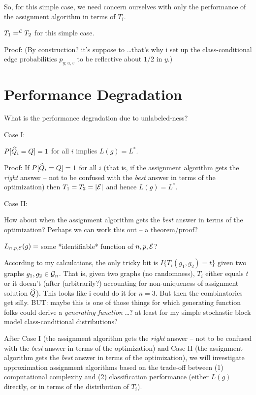 So, for this simple case,
we need concern ourselves with only the performance of the assignment algorithm in terms of $T_i$.

\thma
$T_1 =^{\mathcal{L}} T_2$ for this simple case.
\thmb

Proof:
(By construction? it's suppose to \dots that's why i set up the class-conditional edge probabilities
 $p_{y;u,v}$ to be reflective about $1/2$ in $y$.)




\section{Performance Degradation}

What is the performance degradation due to unlabeled-ness?

Case I:

\thma
$P[\widehat{Q}_i = Q]=1$ for all $i$ implies $L(g)=L^*$.
\thmb

Proof:
If $P[\widehat{Q}_i = Q]=1$ for all $i$
(that is, if the assignment algorithm gets the {\em right} answer --
not to be confused with the {\em best} answer
in terms of the optimization)
then $T_1=T_2=|\mathcal{E}|$ and hence $L(g)=L^*$.


Case II:

How about when the assignment algorithm gets the {\em best} answer
in terms of the optimization?
Perhaps we can work this out -- a theorem/proof?

\thma
$L_{n,p,\mathcal{E}}(g) =$ some *identifiable* function of $n,p,\mathcal{E}$?
\thmb

According to my calculations,
the only tricky bit is $I\{T_i(g_1,g_2) = t\}$
given two graphs $g_1,g_2 \in \mathcal{G}_n$.
That is, given two graphs (no randomness),
$T_i$ either equals $t$ or it doesn't
(after (arbitrarily?) accounting for non-uniqueness
of assignment solution $\widehat{Q}$).
This looks like i could do it for $n=3$.
But then the combinatorics get silly.
BUT: maybe this is one of those things for which
generating function folks
could derive a {\em generating function} \dots?
at least for my simple stochastic block model
class-conditional distributions?


After Case I
(the assignment algorithm gets the {\em right} answer --
not to be confused with the {\em best} answer in terms of the optimization)
and Case II
(the assignment algorithm gets the {\em best} answer in terms of the optimization),
we will investigate approximation assignment algorithms based on the trade-off between
(1) computational complexity and
(2) classification performance
(either $L(g)$ directly, or in terms of the distribution of $T_i$).


